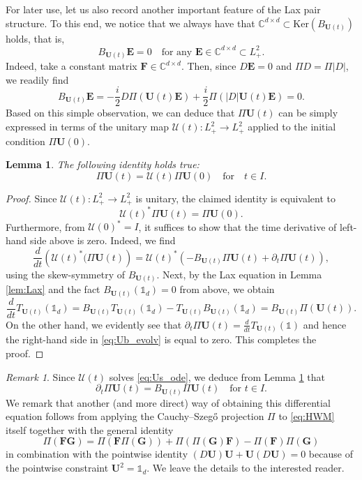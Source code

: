 \documentclass[10pt,reqno,a4paper]{amsart}
\newtheorem{lem}{Lemma}[section]
\theoremstyle{definition}
\theoremstyle{remark}
\theoremstyle{remark}
\newtheorem*{remark*}{Remark}
\numberwithin{equation}{section}
\newcommand{\C}{\mathbb{C}}
\renewcommand{\ker}{\mathrm{Ker}}
\newcommand{\pt}{\partial}
\newcommand{\be}{\begin{equation}}
\newcommand{\ee}{\end{equation}}
\newcommand{\Ub}{\mathbf{U}}
\newcommand{\Fb}{\mathbf{F}}
\newcommand{\Eb}{\mathbf{E}}
\newcommand{\Gb}{\mathbf{G}}
\newcommand{\id}{I}
\newcommand{\Us}{\mathscr{U}}
\begin{document}
For later use, let us also record another important feature of the Lax pair structure. To this end, we notice that we always have that $\C^{d \times d} \subset \ker(B_{\Ub(t)})$ holds, that is,
\be \label{eq:Bu_kernel}
B_{\Ub(t)} \Eb = 0 \quad \mbox{for any $\Eb \in  \C^{d \times d} \subset L^2_+$}.
\ee
Indeed, take a constant matrix $\Fb \in \C^{d \times d}$. Then, since $D \Eb= 0$ and $\Pi D = \Pi |D|$, we readily find
$$
B_{\Ub(t)} \Eb = -\frac{i}{2} D \Pi(\Ub(t) \Eb) + \frac{i}{2} \Pi (|D|\Ub(t) \Eb) = 0.
$$
Based on this simple observation, we can deduce that $\Pi \Ub(t)$ can be simply expressed in terms of the unitary map $\Us(t): L^2_+ \to L^2_+$ applied to the initial condition $\Pi \Ub(0)$. 

\begin{lem} \label{lem:HWM_Bu}
The following identity holds true:
$$
\Pi \Ub(t) = \Us(t) \Pi \Ub(0) \quad \mbox{for} \quad t \in I.
$$
\end{lem}



\begin{proof}
Since $\Us(t) : L^2_+ \to L^2_+$ is unitary, the claimed identity is equivalent to
$$
\Us(t)^* \Pi \Ub(t) = \Pi \Ub(0).
$$
Furthermore, from $\Us(0)^* = \id$, it suffices to show that the time derivative of left-hand side above is zero. Indeed, we find
\be \label{eq:Ub_evolv}
\frac{d}{dt} \left (\Us(t)^* (\Pi \Ub(t) \right ) = \Us(t)^* \left ( -B_{\Ub(t)} \Pi \Ub(t) + \pt_t \Pi \Ub(t) \right ),
\ee
using the skew-symmetry of $B_{\Ub(t)}$. Next, by the Lax equation in Lemma \ref{lem:Lax} and the fact $B_{\Ub(t)}(\mathds{1}_d)=0$ from above, we obtain
$$
\frac{d}{dt} T_{\Ub(t)}(\mathds{1}_d) = B_{\Ub(t)} T_{\Ub(t)}(\mathds{1}_d) - T_{\Ub(t)} B_{\Ub(t)}(\mathds{1}_d) = B_{\Ub(t)} \Pi(\Ub(t)).
$$
On the other hand, we evidently see that $\pt_t \Pi \Ub(t) = \frac{d}{dt} T_{\Ub(t)}(\mathds{1})$ and hence the right-hand side in \eqref{eq:Ub_evolv} is equal to zero. This completes the proof.
\end{proof}

\begin{remark*}
Since $\Us(t)$ solves \eqref{eq:Us_ode}, we deduce from Lemma \ref{lem:HWM_Bu} that
\be
\pt_t \Pi \Ub(t) = B_{\Ub(t)} \Pi \Ub(t) \quad \mbox{for $t \in I$}.
\ee
We remark that another (and more direct) way of obtaining this differential equation follows from applying the Cauchy--Szeg\H{o} projection $\Pi$ to \eqref{eq:HWM} itself together with the general identity
$$
\Pi (\Fb \Gb) = \Pi( \Fb \Pi(\Gb)) + \Pi(\Pi(\Gb) \Fb) - \Pi(\Fb) \Pi(\Gb)
$$
in combination with the pointwise identity $(D \Ub) \Ub + \Ub (D \Ub) = 0$ because of the pointwise constraint $\Ub^2 =\mathds{1}_d$. We leave the details to the interested reader.
\end{remark*}
\end{document}
